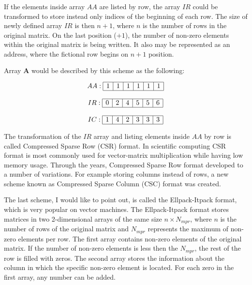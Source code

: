 \documentclass[thesis=M,english]{FITthesis}[2012/10/20]
\begin{document}
If the elements inside array $AA$ are listed by row, the array $IR$ could be transformed to store instead only indices of the beginning of each row. The size of newly defined array $IR$ is then $n+1$, where $n$ is the number of rows in the original matrix. On the last position ($+1$), the number of non-zero elements within the original matrix is being written. It also may be represented as an address, where the fictional row begins on $n+1$ position. 

Array $\textbf{A}$ would be described by this scheme as the following:

$$
\begin{array}{c}
AA:
\begin{array}{|c|c|c|c|c|c|}
 \hline
 1 & 1 & 1 & 1 & 1 & 1 \\
 \hline
\end{array}
\\ \\
IR:
\begin{array}{|c|c|c|c|c|c|}
 \hline
 0 & 2 & 4 & 5 & 5 & 6 \\
 \hline
\end{array}
\\ \\
IC:
\begin{array}{|c|c|c|c|c|c|}
 \hline
 1 & 4 & 2 & 3 & 3 & 3 \\
 \hline
\end{array}
\end{array}
$$



The transformation of the $IR$ array and listing elements inside $AA$ by row is called Compressed Sparse Row (CSR) format. In scientific computing CSR format is most commonly used for vector-matrix multiplication while having low memory usage.
Through the years, Compressed Sparse Row format developed to a number of variations. 
For example storing columns instead of rows, a new scheme known as Compressed Sparse Column (CSC) format was created.

The last scheme, I would like to point out, is called the Ellpack-Itpack format, which is very popular on vector machines. The Ellpack-Itpack format stores matrices in two 2-dimensional arrays of the same size $n \times N_{mpr}$, where $n$ is the number of rows of the original matrix and $N_{mpr}$ represents the maximum of non-zero elements per row. The first array contains non-zero elements of the original matrix. If the number of non-zero elements is less then the $N_{mpr}$, the rest of the row is filled with zeros. The second array stores the information about the column in which the specific non-zero element is located. For each zero in the first array, any number can be added.
\end{document}

